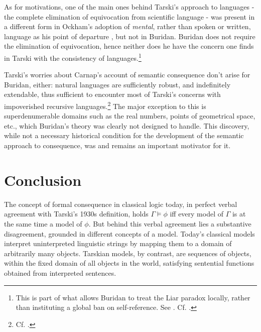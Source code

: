 \documentclass[]{article}
\begin{document}
As for motivations, one of the main ones behind Tarski's approach to languages - the complete elimination of equivocation from scientific language - was present in a different form in Ockham's adoption of \textit{mental}, rather than spoken or written, language as his point of departure \autocite{Trentman1970} \autocite{Spade1980} \autocite{Chalmers1999}, but not in Buridan. Buridan does not require the elimination of equivocation, hence neither does he have the concern one finds in Tarski with the consistency of languages.\footnote{This is part of what allows Buridan to treat the Liar paradox locally, rather than instituting a global ban on self-reference. See \autocite[9.2.6]{BuridanKlimaSD}. Cf. \autocite{Klima2004} \autocite{Klima2008} \autocite{DutilhNovaes2011b} \autocite{Benetreau-Dupin2015}.}

Tarski's worries about Carnap's account of semantic consequence don't arise for Buridan, either: natural languages are sufficiently robust, and indefinitely extendable, thus sufficient to encounter most of Tarski's concerns with impoverished recursive languages.\footnote{Cf. \autocite{BarcanMarcus1978}.} The major exception to this is superdenumerable domains such as the real numbers, points of geometrical space, etc., which Buridan's theory was clearly not designed to handle. This discovery, while not a necessary historical condition for the development of the semantic approach to consequence, was and remains an important motivator for it.

\section{Conclusion}
The concept of formal consequence in classical logic today, in perfect verbal agreement with Tarski's 1930s definition, holds $\Gamma \models \phi$ iff every model of $\Gamma$ is at the same time a model of $\phi$. But behind this verbal agreement lies a substantive disagreement, grounded in different concepts of a model. Today's classical models interpret uninterpreted linguistic strings by mapping them to a domain of arbitrarily many objects. Tarskian models, by contrast, are sequences of objects, within the fixed domain of all objects in the world, satisfying sentential functions obtained from interpreted sentences.
\end{document}
